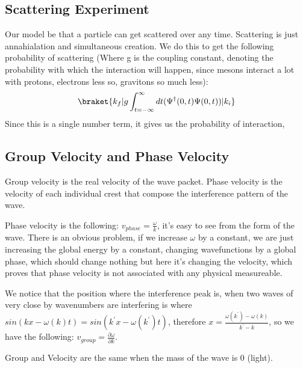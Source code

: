 \subsection{Scattering Experiment}

Our model be that a particle can get scattered over any time. Scattering is just annahialation and simultaneous creation. We do this to get the following probability of scattering (Where g is the coupling constant, denoting the probability with which the interaction will happen, since mesons interact a lot with protons, electrons less so, gravitons so much less):
\begin{eqnarray}
  \braket{k_f|g \int_{t=-\infty}^{\infty} dt (\Psi^\dagger(0, t) \Psi(0, t))|k_i}
\end{eqnarray}
Since this is a single number term, it gives us the probability of interaction, 


\subsection{Group Velocity and Phase Velocity}

Group velocity is the real velocity of the wave packet. Phase velocity is the velocity of each individual crest that compose the interference pattern of the wave. 

Phase velocity is the following: $v_{phase} = \frac{\omega}{k}$, it's easy to see from the form of the wave. There is an obvious problem, if we increase $\omega$ by a constant, we are just increasing the global energy by a constant, changing wavefunctions by a global phase, which should change nothing but here it's changing the velocity, which proves that phase velocity is not associated with any physical measureable.

We notice that the position where the interference peak is, when two waves of very close by wavenumbers are interfering is where $sin(k x - \omega(k) t) = sin(k^\prime x - \omega(k^\prime) t)$, therefore $x = \frac{\omega(k^\prime) - \omega(k)}{k^\prime - k}$, so we have the following: $v_{group} = \frac{\partial \omega}{\partial k}$.

Group and Velocity are the same when the mass of the wave is 0 (light).